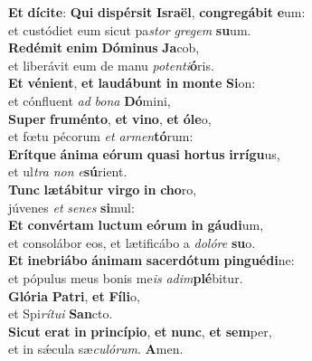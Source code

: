 \evenverse \textbf{Et} \textbf{dí}\textbf{ci}\textbf{te}: \textbf{Qui} \textbf{di}\textbf{spér}\textbf{sit} \textbf{Is}\textbf{ra}\textbf{ël}, \textbf{con}\textbf{gre}\textbf{gá}\textbf{bit} \textbf{e}um:~\*\\
\evenverse et custódiet eum sicut pa\textit{stor} \textit{gre}\textit{gem} \textbf{su}um.\\
\oddverse \textbf{Re}\textbf{dé}\textbf{mit} \textbf{e}\textbf{nim} \textbf{Dó}\textbf{mi}\textbf{nus} \textbf{Ja}cob,~\*\\
\oddverse et liberávit eum de manu \textit{po}\textit{ten}\textit{ti}\textbf{ó}ris.\\
\evenverse \textbf{Et} \textbf{vé}\textbf{ni}\textbf{ent}, \textbf{et} \textbf{lau}\textbf{dá}\textbf{bunt} \textbf{in} \textbf{mon}\textbf{te} \textbf{Si}on:~\*\\
\evenverse et cónfluent \textit{ad} \textit{bo}\textit{na} \textbf{Dó}mini,\\
\oddverse \textbf{Su}\textbf{per} \textbf{fru}\textbf{mén}\textbf{to}, \textbf{et} \textbf{vi}\textbf{no}, \textbf{et} \textbf{ó}\textbf{le}o,~\*\\
\oddverse et fœtu pécorum \textit{et} \textit{ar}\textit{men}\textbf{tó}rum:\\
\evenverse \textbf{E}\textbf{rít}\textbf{que} \textbf{á}\textbf{ni}\textbf{ma} \textbf{e}\textbf{ó}\textbf{rum} \textbf{qua}\textbf{si} \textbf{hor}\textbf{tus} \textbf{ir}\textbf{rí}\textbf{gu}us,~\*\\
\evenverse et ul\textit{tra} \textit{non} \textit{e}\textbf{sú}rient.\\
\oddverse \textbf{Tunc} \textbf{læ}\textbf{tá}\textbf{bi}\textbf{tur} \textbf{vir}\textbf{go} \textbf{in} \textbf{cho}ro,~\*\\
\oddverse júvenes \textit{et} \textit{se}\textit{nes} \textbf{si}mul:\\
\evenverse \textbf{Et} \textbf{con}\textbf{vér}\textbf{tam} \textbf{lu}\textbf{ctum} \textbf{e}\textbf{ó}\textbf{rum} \textbf{in} \textbf{gáu}\textbf{di}um,~\*\\
\evenverse et consolábor eos, et lætificábo a \textit{do}\textit{ló}\textit{re} \textbf{su}o.\\
\oddverse \textbf{Et} \textbf{i}\textbf{ne}\textbf{bri}\textbf{á}\textbf{bo} \textbf{á}\textbf{ni}\textbf{mam} \textbf{sa}\textbf{cer}\textbf{dó}\textbf{tum} \textbf{pin}\textbf{gué}\textbf{di}ne:~\*\\
\oddverse et pópulus meus bonis me\textit{is} \textit{a}\textit{dim}\textbf{plé}bitur.\\
\evenverse \textbf{Gló}\textbf{ri}\textbf{a} \textbf{Pa}\textbf{tri}, \textbf{et} \textbf{Fí}\textbf{li}o,~\*\\
\evenverse et Spi\textit{rí}\textit{tu}\textit{i} \textbf{San}cto.\\
\oddverse \textbf{Si}\textbf{cut} \textbf{e}\textbf{rat} \textbf{in} \textbf{prin}\textbf{cí}\textbf{pi}\textbf{o}, \textbf{et} \textbf{nunc}, \textbf{et} \textbf{sem}per,~\*\\
\oddverse et in sǽcula sæ\textit{cu}\textit{ló}\textit{rum}. \textbf{A}men.\\
